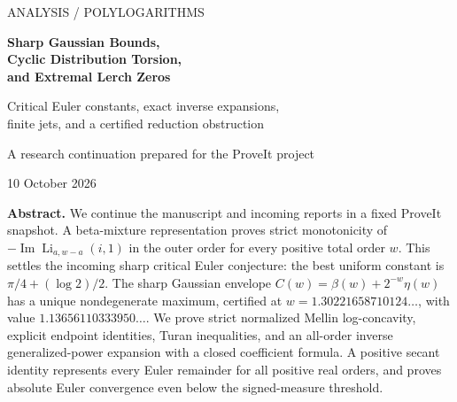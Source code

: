 \documentclass[11pt,a4paper]{article}
\numberwithin{equation}{section}
\theoremstyle{definition}
\theoremstyle{remark}
\DeclareMathOperator{\Li}{Li}
\renewcommand{\Im}{\operatorname{Im}}
\begin{document}
\hypersetup{pageanchor=false}
\begin{titlepage}
\centering
{\large\color{inkblue}ANALYSIS / POLYLOGARITHMS\par}
\vspace{20mm}
{\LARGE\bfseries Sharp Gaussian Bounds,\\[5pt]
Cyclic Distribution Torsion,\\[5pt]
and Extremal Lerch Zeros\par}
\vspace{8mm}
{\large Critical Euler constants, exact inverse expansions,\\
finite jets, and a certified reduction obstruction\par}
\vspace{12mm}
{\large A research continuation prepared for the ProveIt project\par}
\vspace{3mm}
{10 October 2026\par}
\vspace{12mm}
\begin{minipage}{0.91\textwidth}
\small
\textbf{Abstract.}
We continue the manuscript and incoming reports in a fixed ProveIt
snapshot. A beta-mixture representation proves strict monotonicity of
$-\Im\Li_{a,w-a}(i,1)$ in the outer order for every positive total
order $w$. This settles the incoming sharp critical Euler conjecture:
the best uniform constant is $\pi/4+(\log2)/2$. The sharp Gaussian
envelope $C(w)=\beta(w)+2^{-w}\eta(w)$ has a unique nondegenerate
maximum, certified at $w=1.30221658710124\ldots$, with value
$1.13656110333950\ldots$. We prove strict normalized Mellin
log-concavity, explicit endpoint identities, Turan inequalities, and
an all-order inverse generalized-power expansion with a closed
coefficient formula. A positive secant identity represents every
Euler remainder for all positive real orders, and proves absolute
Euler convergence even below the signed-measure threshold.


\end{minipage}
\end{titlepage}
\end{document}
